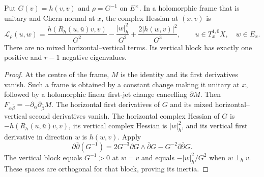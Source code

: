 \begin{lemma}\label{lem:reciprocal-bundle-norm-levi}
Put $G(v)=h(v,v)$ and $\rho=G^{-1}$ on $E^\times$. In a holomorphic frame that is unitary and Chern-normal at $x$, the complex Hessian at $(x,v)$ is
\[
 \mathcal L_\rho(u,w)
 =\frac{h(R_h(u,\bar u)v,v)}{G^2}
  -\frac{|w|_h^2}{G^2}
  +\frac{2|h(w,v)|^2}{G^3},
 \qquad u\in T_x^{1,0}X,\quad w\in E_x.
\]
There are no mixed horizontal--vertical terms. Its vertical block has exactly one positive and $r-1$ negative eigenvalues.
\end{lemma}
\begin{proof}
At the centre of the frame, $M$ is the identity and its first derivatives vanish. Such a frame is obtained by a constant change making it unitary at $x$, followed by a holomorphic linear first-jet change cancelling $\partial M$. Then $F_{\alpha\bar\beta}=-\partial_\alpha\partial_{\bar\beta}M$. The horizontal first derivatives of $G$ and its mixed horizontal--vertical second derivatives vanish. The horizontal complex Hessian of $G$ is $-h(R_h(u,\bar u)v,v)$, its vertical complex Hessian is $|w|_h^2$, and its vertical first derivative in direction $w$ is $h(w,v)$. Apply
\[
 \partial\bar\partial(G^{-1})
 =2G^{-3}\partial G\wedge\bar\partial G-G^{-2}\partial\bar\partial G.
\]
The vertical block equals $G^{-1}>0$ at $w=v$ and equals $-|w|_h^2/G^2$ when $w\perp_h v$. These spaces are orthogonal for that block, proving its inertia.
\end{proof}

